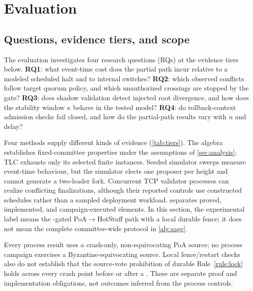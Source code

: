 \section{Evaluation}
\label{sec:eval}

\subsection{Questions, evidence tiers, and scope}
The evaluation investigates four research questions (RQs) at the evidence tiers below.
\textbf{RQ1}: what event-time cost does the partial \CutCert{} path incur relative to a modeled
scheduled halt and to internal switches? \textbf{RQ2}: which observed conflicts follow target
quorum policy, and which unauthorized crossings are stopped by the \CutCert{} gate?
\textbf{RQ3}: does shadow validation detect injected root divergence, and how does the
stability window $\kappa$ behave in the tested model? \textbf{RQ4}: do rollback-context
admission checks fail closed, and how do the partial-path results vary with $n$ and delay?

Four methods supply different kinds of evidence (\cref{tab:tiers}). The algebra establishes
fixed-committee properties under the assumptions of \cref{sec:analysis}; TLC exhausts only its
selected finite instances. Seeded simulator sweeps measure event-time behaviour, but the simulator
elects one proposer per height and cannot generate a two-leader fork. Concurrent TCP validator
processes can realize conflicting finalizations, although their reported controls use constructed
schedules rather than a sampled deployment workload.  separates proved,
implemented, and campaign-executed elements. In this section, the experimental label \sage{}
means the \CutCert-gated PoA$\to$HotStuff path with a local durable fence; it does not mean the
complete committee-wide protocol in \cref{alg:sage}.

Every process result uses a crash-only, non-equivocating PoA source; no process campaign exercises a
Byzantine-equivocating source. Local fence/restart checks also do not establish that the source-vote
prohibition of durable Rule~\ref{rule:lock} holds across every crash point before or after a
\CutCert. These are separate proof and implementation obligations, not outcomes inferred from
the process controls.


